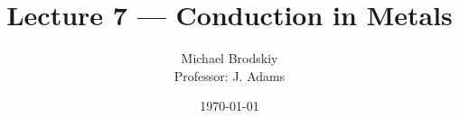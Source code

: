 


\title{Lecture 7 — Conduction in Metals}
\date{\today}
\author{Michael Brodskiy\\ \small Professor: J. Adams}



\maketitle

